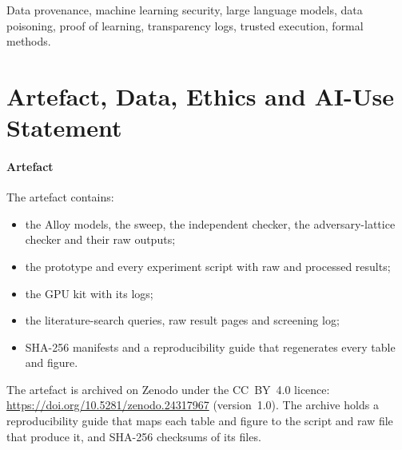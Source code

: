 \documentclass[journal,10pt]{IEEEtran}
\theoremstyle{definition}
\begin{document}
\begin{abstract}
adds censorship-resistant inclusion to a witnessed log and nothing else that these goals
need. We test the model on a prototype with real cryptography, simulated trusted execution,
exact training re-execution and an exhaustive adaptive adversary. Across 3.5 million
executions, no accepted execution violated a goal that the model guarantees, and the attacks
realised all 4,440 predicted failures. In a 1,024-run grinding experiment, a prover set
$\log_2T$ chosen bits of model behaviour while passing re-execution, within one bit of our
bound. The same curve holds for DistilBERT and Qwen2.5-0.5B~+~LoRA fine-tuning on a consumer
GPU, where fine-tuning replayed bit for bit on one machine. In the same setting, an
authorised-source backdoor at 2\% poison passed every provenance check and raised attack
success by 20--75 points, while spectral-signature recall averaged 25\% at 6\% precision. The
results are exact for an abstract single-run model. The experiments cover fine-tuning with one
model family per experiment and one detector at GPU scale (three on the prototype), not
pre-training.
\end{abstract}

\begin{IEEEkeywords}
Data provenance, machine learning security, large language models, data poisoning,
proof of learning, transparency logs, trusted execution, formal methods.
\end{IEEEkeywords}









\section{Artefact, Data, Ethics and AI-Use Statement}\label{sec:artefact}
\paragraph{Artefact}
The artefact contains:
\begin{itemize}
\item the Alloy models, the sweep, the independent checker, the adversary-lattice checker and
  their raw outputs;
\item the prototype and every experiment script with raw and processed results;
\item the GPU kit with its logs;
\item the literature-search queries, raw result pages and screening log;
\item SHA-256 manifests and a reproducibility guide that regenerates every table and figure.
\end{itemize}
The artefact is archived on Zenodo under the CC~BY~4.0 licence:
\url{https://doi.org/10.5281/zenodo.24317967} (version~1.0). The archive holds a reproducibility
guide that maps each table and figure to the script and raw file that produce it, and SHA-256
checksums of its files.
\end{document}
